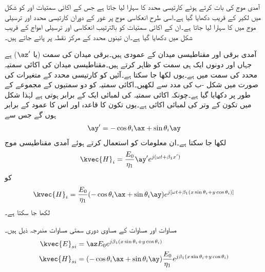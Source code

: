 آمدی موج کی بات کرتے ہوئے کارتیسی محدد  کا سہارا لیا جاتا ہے  جس کے اکائی سمتیات  اور  کو  شکل  میں لکیر  کے قریب دکھایا گیا ہے۔اسی طرح  انعکاسی موج پر غور کے دوران  کارتیسی محدد  اور ترسیلی موج میں  کا سہارا لیا جاتا ہے۔ان کے اکائی سمتیات کو بالترتیب  انعکاسی اور ترسیلی امواج کے قریب شکل  میں دکھایا گیا ہے۔ان تینوں محدد کے مرکز نقطہ  پر پائے جاتے ہیں۔

آمدی برقی اور مقناطیسی میدان  کے عمودی ہیں۔برقی میدان کی سمت  (یا $\az'$) ہے جہاں  اور  دونوں ایک ہی سمت کو ظاہر کرتے ہیں۔مقناطیسی میدان   کی اکائی سمتیہ  محدد   کی سمت میں ہے۔یوں   لکھا جا سکتا ہے۔آئیں  کو کارتیسی محدد  کے متغیرات کی صورت میں شکل -ب کی مدد سے لکھیں۔اکائی سمتیہ  کو دو سمتیوں کے مجموعے کے طور پر دکھایا گیا ہے۔چونکہ اکائی سمتیہ کی لمبائی ایک کے برابر ہوتی ہے لہٰذا شکل میں تکون کے وتر کی لمبائی اکائی ہے۔یوں  تکون کا قاعدہ  اور اس کا عمود  کے برابر ہوں گے جس سے
\begin{align}\label{مساوات_ترچھی_اکائی_وائے_ڈیش}
\ay'=-\cos \theta_i \ax+\sin \theta_i \ay
\end{align} 
لکھا جا سکتا ہے۔ان معلومات کو استعمال کرتے ہوئے آمدی مقناطیسی موج
\begin{align*}
\kvec{H}_i&=\frac{E_0}{\eta_1} \ay' e^{j(\omega t +\beta_1 x')}
\end{align*}
کو
\begin{align}\label{مساوات_ترچھی_عمودی_برقی_میں_مقناطیسی_آمدی}
\kvec{H}_i=\frac{E_0}{\eta_1} (-\cos \theta_i \ax+\sin \theta_i \ay) e^{j[\omega t +\beta_1 (x\sin \theta_i +y \cos \theta_i)]}
\end{align}
لکھا جا سکتا ہے۔

مساوات  اور مساوات  کے مساوی دوری سمتی مساوات مندرجہ ذیل ہیں۔
\begin{align}
\kvec{E}_{si} & = \az E_0 e^{j\beta_1 (x\sin \theta_i +y \cos \theta_i)} \label{مساوات_ترچھی_آمدی_برقی_میدان_دوری_سمتی}\\
\kvec{H}_{si} & = (-\cos \theta_i \ax+\sin \theta_i \ay)\frac{E_0}{\eta_1} e^{j\beta_1 (x\sin \theta_i +y \cos \theta_i)} \label{مساوات_ترچھی_آمدی_مقناطیسی_میدان_دوری_سمتی}
\end{align}

